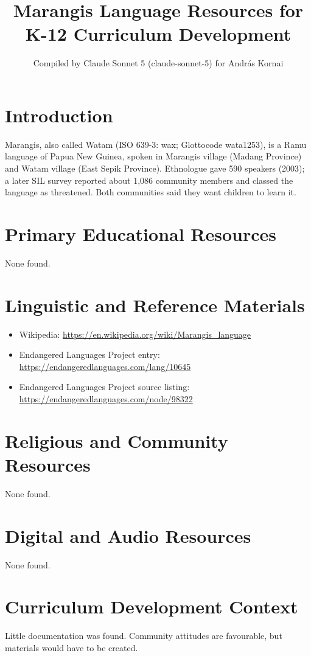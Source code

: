 \documentclass[12pt]{article}
\title{Marangis Language Resources for K-12 Curriculum Development}
\author{Compiled by Claude Sonnet 5 (claude-sonnet-5) for Andr\'as Kornai}
\date{}
\begin{document}
\maketitle
\section{Introduction}
Marangis, also called Watam (ISO 639-3: wax; Glottocode wata1253), is a Ramu language of Papua New Guinea, spoken in Marangis village (Madang Province) and Watam village (East Sepik Province). Ethnologue gave 590 speakers (2003); a later SIL survey reported about 1,086 community members and classed the language as threatened. Both communities said they want children to learn it.
\section{Primary Educational Resources}
None found.
\section{Linguistic and Reference Materials}
\begin{itemize}
\item Wikipedia: \url{https://en.wikipedia.org/wiki/Marangis_language}
\item Endangered Languages Project entry: \url{https://endangeredlanguages.com/lang/10645}
\item Endangered Languages Project source listing: \url{https://endangeredlanguages.com/node/98322}
\end{itemize}
\section{Religious and Community Resources}
None found.
\section{Digital and Audio Resources}
None found.
\section{Curriculum Development Context}
Little documentation was found. Community attitudes are favourable, but materials would have to be created.
\end{document}
